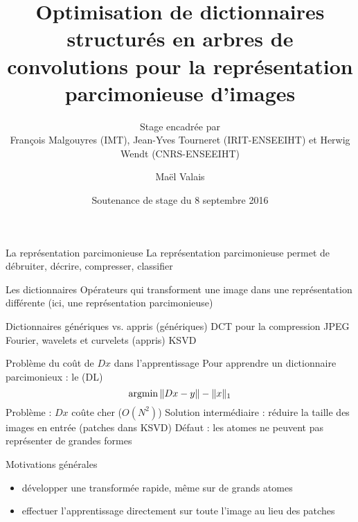 


\title{Optimisation de dictionnaires structurés en arbres de convolutions pour la représentation parcimonieuse d'images}
\subtitle{Stage encadrée par\\François Malgouyres (IMT), Jean-Yves Tourneret (IRIT-ENSEEIHT) et Herwig Wendt (CNRS-ENSEEIHT)}

\date{Soutenance de stage du 8 septembre 2016}
\author{Maël Valais}



\maketitle





\begin{frame}[label=LO]{La représentation parcimonieuse}
La \alert{représentation parcimonieuse} permet de débruiter, décrire, compresser, classifier
\end{frame}


\begin{frame}{Les dictionnaires}
Opérateurs qui transforment une image dans une représentation différente (ici, une représentation parcimonieuse)
\end{frame}


\begin{frame}{Dictionnaires génériques vs. appris}
(génériques)
DCT pour la compression JPEG
Fourier, wavelets et curvelets 
(appris)
KSVD
\end{frame}


\begin{frame}{Problème du coût de $Dx$ dans l'apprentissage}
Pour apprendre un dictionnaire parcimonieux : le (DL)
\begin{equation}
	\operatorname{argmin} \| Dx - y \| - \|x\|_1
\end{equation}
Problème : $Dx$ coûte cher ($O(N^2)$)
Solution intermédiaire : réduire la taille des images en entrée (patches dans KSVD)
Défaut : les atomes ne peuvent pas représenter de grandes formes
\end{frame}


\begin{frame}{Motivations générales}
	\begin{itemize}
		\item développer une transformée rapide, même sur de grands atomes
		\item effectuer l'apprentissage directement sur toute l'image au lieu des patches
	\end{itemize}
\end{frame}


